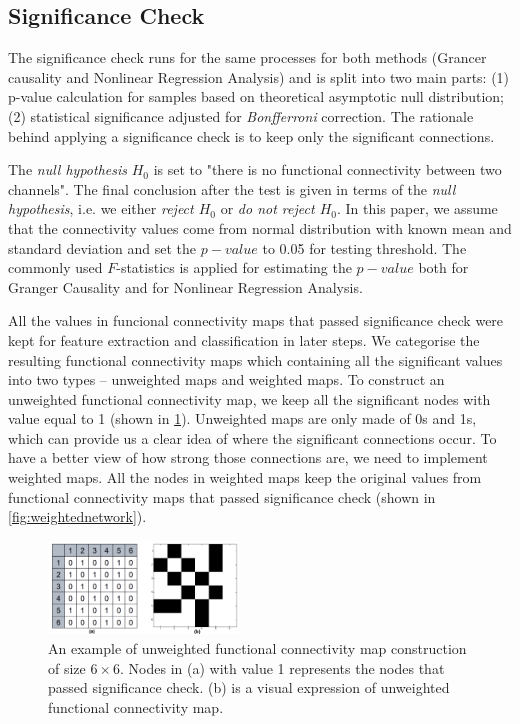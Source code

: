 \subsection{Significance Check}
The significance check runs for the same processes for both methods (Grancer causality and Nonlinear Regression Analysis) and is split into two main parts: (1) p-value calculation for samples based on theoretical asymptotic null distribution; (2) statistical significance adjusted for \emph{Bonfferroni} correction. The rationale behind applying a significance check is to keep only the significant connections. 

The \emph{null hypothesis} $H_0$ is set to "there is no functional connectivity between two channels". The final conclusion after the test is given in terms of the \emph{null hypothesis}, i.e. we either \emph{reject $H_0$} or \emph{do not reject $H_0$}. In this paper, we assume that the connectivity values come from normal distribution with known mean and standard deviation and set the $p-value$ to 0.05 for testing threshold. The commonly used $F$-statistics is applied for estimating the $p-value$ both for Granger Causality and for Nonlinear Regression Analysis.

All the values in funcional connectivity maps that passed significance check were kept for feature extraction and classification in later steps. We categorise the resulting functional connectivity maps which containing all the significant values into two types -- unweighted maps and weighted maps. To construct an unweighted functional connectivity map, we keep all the significant nodes with value equal to 1 (shown in \ref{fig:unweightednetwork}). Unweighted maps are only made of 0s and 1s, which can provide us a clear idea of where the significant connections occur. To have a better view of how strong those connections are, we need to implement weighted maps. All the nodes in weighted maps keep the original values from functional connectivity maps that passed significance check (shown in \ref{fig:weightednetwork}).

\begin{figure}[!t]
    \centering
    \includegraphics[width=0.45\textwidth]{./images/unweightednetwork.png}
    \caption{An example of unweighted functional connectivity map construction of size $6 \times 6$. Nodes in (a) with value 1 represents the nodes that passed significance check. (b) is a visual expression of unweighted functional connectivity map.}
    \label{fig:unweightednetwork}
\end{figure}

